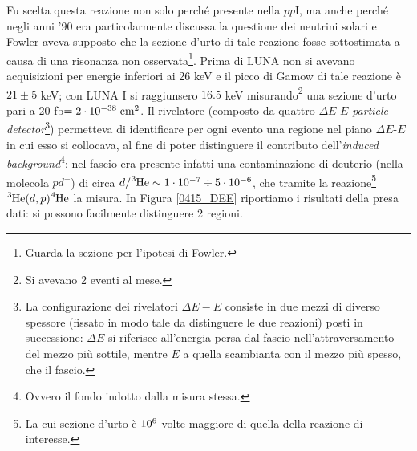 \noindent Fu scelta questa reazione non solo perché presente nella $pp$I, ma anche perché negli anni '90 era particolarmente discussa la questione dei neutrini solari e Fowler aveva supposto che la sezione d'urto di tale reazione fosse sottostimata a causa di una risonanza non osservata\footnote{Guarda la sezione  per l'ipotesi di Fowler.}. Prima di LUNA non si avevano acquisizioni per energie inferiori ai 26 keV e il picco di Gamow di tale reazione è $21 \pm 5$ keV; con LUNA I si raggiunsero $16.5$ keV misurando\footnote{Si avevano 2 eventi al mese.} una sezione d'urto pari a 20 fb$= 2\cdot 10^{-38}\;\mbox{cm}^2$. Il rivelatore (composto da quattro $\Delta E$-$E$ \textit{particle detector}\footnote{La configurazione dei rivelatori $\Delta E -E$ consiste in due mezzi di diverso spessore (fissato in modo tale da distinguere le due reazioni) posti in successione: $\Delta E$ si riferisce all'energia persa dal fascio nell'attraversamento del mezzo più sottile, mentre $E$ a quella scambianta con il mezzo più spesso, che  il fascio.}) permetteva di identificare per ogni evento una regione nel piano $\Delta E$-$E$ in cui esso si collocava, al fine di poter distinguere il contributo dell'\textit{induced background}\footnote{Ovvero il fondo indotto dalla misura stessa.}: nel fascio era presente infatti una contaminazione di deuterio (nella molecola $pd^+$) di circa $d/\ce{^3He}\sim 1\cdot\ord{-7} \div 5\cdot\ord{-6}$, che tramite la reazione\footnote{La cui sezione d'urto è $10^{6}$ volte maggiore di quella della reazione di interesse.} $\ce{^3He}(d,p)\ce{^4He}$  la misura. In Figura \ref{0415_DEE} riportiamo i risultati della presa dati: si possono facilmente distinguere 2 regioni. 

